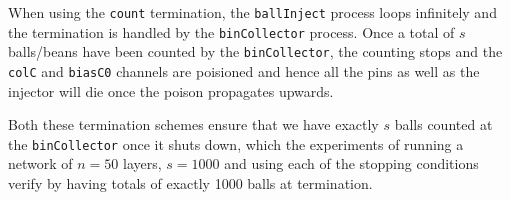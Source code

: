 \documentclass[11pt,a4paper]{article}
\begin{document}
When using the \texttt{count} termination, the \texttt{ballInject} process loops
infinitely and the termination is handled by the \texttt{binCollector} process.
Once a total of $s$ balls/beans have been counted by the \texttt{binCollector},
the counting stops and the \texttt{colC} and \texttt{biasC0} channels are poisioned
and hence all the pins as well as the injector will die once the poison
propagates upwards.

Both these termination schemes ensure that we have exactly $s$ balls counted at
the \texttt{binCollector} once it shuts down, which the experiments of running a
network of $n = 50$ layers, $s = 1000$ and using each of the stopping conditions
verify by having totals of exactly 1000 balls at termination.

\clearpage

\end{document}
